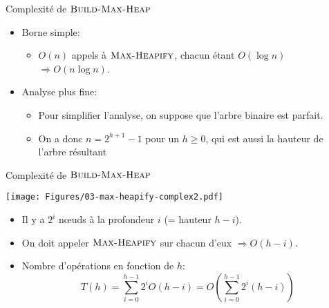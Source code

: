 \begin{frame}{Complexité de $\textnormal{\scshape Build-Max-Heap}$}

\begin{itemize}
\item Borne simple:
\begin{itemize}
\item $O(n)$ appels à $\textnormal{\scshape Max-Heapify}$, chacun étant $O(\log n)$ $\Rightarrow O(n\log n)$.
\end{itemize}

\bigskip


\item Analyse plus fine:
\begin{itemize}
\item Pour simplifier l'analyse, on suppose que l'arbre binaire est parfait.
\item On a donc $n=2^{h+1}-1$ pour un $h\geq 0$, qui est aussi la hauteur de l'arbre résultant
\end{itemize}
\end{itemize}


\end{frame}

\begin{frame}{Complexité de $\textnormal{\scshape Build-Max-Heap}$}
\centerline{\texttt{[image: Figures/03-max-heapify-complex2.pdf]}}

\begin{itemize}
\item Il y a $2^i$ n\oe uds à la profondeur $i$ (= hauteur $h-i$).
\item On doit appeler $\textnormal{\scshape Max-Heapify}$ sur chacun d'eux $\Rightarrow O(h-i)$.
\item Nombre d'opérations en fonction de $h$:
$$T(h)=\sum_{i=0}^{h-1} 2^i O(h-i)=O(\sum_{i=0}^{h-1} 2^i (h-i))$$
\end{itemize}
\end{frame}


